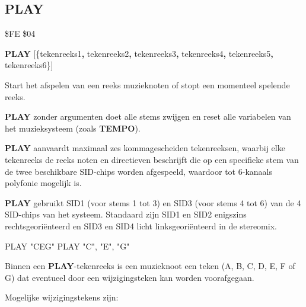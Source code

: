 \subsection{PLAY}
\begin{description}[leftmargin=2cm,style=nextline]
\item [Token:]    \$FE \$04

\item [Formaat:]   {\bf PLAY} [\{tekenreeks1{\bf,} tekenreeks2{\bf,} tekenreeks3{\bf,} tekenreeks4{\bf,} tekenreeks5{\bf,} tekenreeks6\}]

\item [Gebruik:]    Start het afspelen van een reeks muzieknoten of stopt een momenteel spelende reeks.

                  {\bf PLAY} zonder argumenten doet alle stems zwijgen en reset alle variabelen van het muzieksysteem (zoals {\bf TEMPO}).

                  {\bf PLAY} aanvaardt maximaal zes kommagescheiden tekenreeksen, waarbij elke tekenreeks de reeks noten en directieven beschrijft die op een specifieke stem van de twee beschikbare SID-chips worden afgespeeld, waardoor tot 6-kanaals polyfonie mogelijk is.

                  {\bf PLAY} gebruikt SID1 (voor stems 1 tot 3) en SID3 (voor stems 4 tot 6) van de 4 SID-chips van het systeem. Standaard zijn SID1 en SID2 enigszins rechtsgeoriënteerd en SID3 en SID4 licht linksgeoriënteerd in de stereomix.

\begin{screencode}
PLAY "CEG"
PLAY "C", "E", "G"
\end{screencode}

                  Binnen een {\bf PLAY}-tekenreeks is een muzieknoot een teken (A, B, C, D, E, F of G) dat eventueel door een wijzigingsteken kan worden voorafgegaan.

                  Mogelijke wijzigingstekens zijn:


\end{description}
